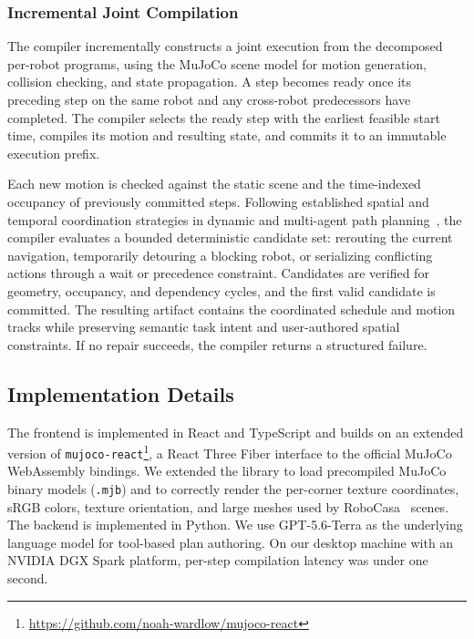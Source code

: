 \subsubsection{Incremental Joint Compilation}

The compiler incrementally constructs a joint execution from the decomposed per-robot programs, using the MuJoCo scene model for motion generation, collision checking, and state propagation.
A step becomes ready once its preceding step on the same robot and any cross-robot predecessors have completed.
The compiler selects the ready step with the earliest feasible start time, compiles its motion and resulting state, and commits it to an immutable execution prefix.

Each new motion is checked against the static scene and the time-indexed occupancy of previously committed steps.
Following established spatial and temporal coordination strategies in dynamic and multi-agent path planning~\cite{phillips2011sipp,sharon2012cbs,dewilde2014pushrotate}, the compiler evaluates a bounded deterministic candidate set: rerouting the current navigation, temporarily detouring a blocking robot, or serializing conflicting actions through a wait or precedence constraint.
Candidates are verified for geometry, occupancy, and dependency cycles, and the first valid candidate is committed.
The resulting artifact contains the coordinated schedule and motion tracks while preserving semantic task intent and user-authored spatial constraints.
If no repair succeeds, the compiler returns a structured failure.

\subsection{Implementation Details}
\label{sec:implementation-details}

The frontend is implemented in React and TypeScript and builds on an extended version of \texttt{mujoco-react}\footnote{\url{https://github.com/noah-wardlow/mujoco-react}}, a React Three Fiber interface to the official MuJoCo WebAssembly bindings.
We extended the library to load precompiled MuJoCo binary models (\texttt{.mjb}) and to correctly render the per-corner texture coordinates, sRGB colors, texture orientation, and large meshes used by RoboCasa~\cite{nasiriany2024robocasa,nasiriany2026robocasa365} scenes.
The backend is implemented in Python.
We use GPT-5.6-Terra as the underlying language model for tool-based plan authoring.
On our desktop machine with an NVIDIA DGX Spark platform, per-step compilation latency was under one second.
